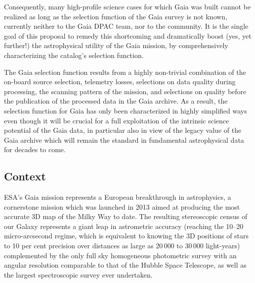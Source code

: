 Consequently, many high-profile science cases for which Gaia was built cannot be realized as long as the selection function of the Gaia survey is not known, currently neither to the Gaia DPAC team, nor to the community. It is the single goal of this proposal to remedy this shortcoming and dramatically boost (yes, yet further!) the astrophysical utility of the Gaia mission, by comprehensively characterizing the catalog's selection function.

The Gaia selection function results from a highly non-trivial combination of the on-board source selection, telemetry losses, selections on data quality during processing, the scanning pattern of the mission, and selections on quality before the publication of the processed data in the Gaia archive. As a result, the selection function for Gaia has only been characterized in highly simplified ways  even though it will be crucial for a full exploitation of the intrinsic science potential of the Gaia data, in particular also in view of the legacy value of the Gaia archive which will remain the standard in fundamental astrophysical data for decades to come.

\subsection{Context}
\label{sec:context}

ESA's Gaia mission \cite{2016A&A...595A...1G} represents a European breakthrough in astrophysics, a cornerstone mission which was launched in 2013 aimed at producing the most accurate 3D map of the Milky Way to date. The resulting stereoscopic census of our Galaxy represents a giant leap in astrometric accuracy (reaching the 10--20 micro-arcsecond regime, which is equivalent to knowing the 3D positions of stars to 10 per cent precision over distances as large as $20\,000$ to $30\,000$ light-years) complemented by the only full sky homogeneous photometric survey with an angular resolution comparable to that of the Hubble Space Telescope, as well as the largest spectroscopic survey ever undertaken. 

